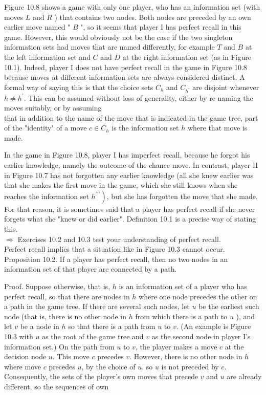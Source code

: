 \documentclass[12pt]{article}
\begin{document}
Figure 10.8 shows a game with only one player, who has an information set (with moves $L$ and $R$ ) that contains two nodes. Both nodes are preceded by an own earlier move named " $B$ ", so it seems that player I has perfect recall in this game. However, this would obviously not be the case if the two singleton information sets had moves that are named differently, for example $T$ and $B$ at the left information set and $C$ and $D$ at the right information set (as in Figure 10.1). Indeed, player I does not have perfect recall in the game in Figure 10.8 because moves at different information sets are always considered distinct. A formal way of saying this is that the choice sets $C_{h}$ and $C_{h^{\prime}}$ are disjoint whenever $h \neq h^{\prime}$. This can be assumed without loss of generality, either by re-naming the moves suitably, or by assuming\\
that in addition to the name of the move that is indicated in the game tree, part of the "identity" of a move $c \in C_{h}$ is the information set $h$ where that move is made.

In the game in Figure 10.8, player I has imperfect recall, because he forgot his earlier knowledge, namely the outcome of the chance move. In contrast, player II in Figure 10.7 has not forgotten any earlier knowledge (all she knew earlier was that she makes the first move in the game, which she still knows when she reaches the information set $\left.h^{\prime \prime \prime}\right)$, but she has forgotten the move that she made. For that reason, it is sometimes said that a player has perfect recall if she never forgets what she "knew or did earlier". Definition 10.1 is a precise way of stating this.\\
$\Rightarrow$ Exercises 10.2 and 10.3 test your understanding of perfect recall.\\
Perfect recall implies that a situation like in Figure 10.3 cannot occur.\\
Proposition 10.2. If a player has perfect recall, then no two nodes in an information set of that player are connected by a path.

Proof. Suppose otherwise, that is, $h$ is an information set of a player who has perfect recall, so that there are nodes in $h$ where one node precedes the other on a path in the game tree. If there are several such nodes, let $u$ be the earliest such node (that is, there is no other node in $h$ from which there is a path to $u$ ), and let $v$ be a node in $h$ so that there is a path from $u$ to $v$. (An example is Figure 10.3 with $u$ as the root of the game tree and $v$ as the second node in player I's information set.) On the path from $u$ to $v$, the player makes a move $c$ at the decision node $u$. This move $c$ precedes $v$. However, there is no other node in $h$ where move $c$ precedes $u$, by the choice of $u$, so $u$ is not preceded by $c$. Consequently, the sets of the player's own moves that precede $v$ and $u$ are already different, so the sequences of own
\end{document}
